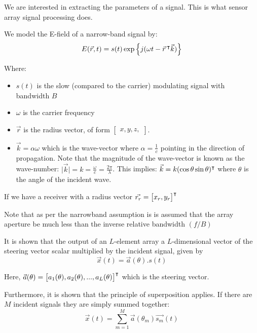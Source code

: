 We are interested in extracting the parameters of a signal. This is what sensor array signal processing does.

We model the E-field of a narrow-band signal by:
\begin{equation}
  E(\vec{r}, t) = s(t) \exp \left\{ j(\omega t - \vec{r}\, ^\intercal \vec{k}) \right\}
\end{equation}

Where:
\begin{itemize}
  \item \(s(t)\) is the slow (compared to the carrier) modulating signal with bandwidth \(B\)
  \item \(\omega\) is the carrier frequency
  \item \( \vec{r} \) is the radius vector, of form \( \begin{bmatrix} x, y, z, \end{bmatrix} \).
  \item \(\vec{k} = \alpha\omega\) which is the wave-vector where \(\alpha = \frac{1}{c}\) pointing in the direction of propagation. Note that the magnitude of the wave-vector is known as the wave-number: \(\lvert \vec{k} \rvert = k = \frac{\omega}{c} = \frac{2\pi}{\lambda}\). This implies: \(\vec{k} = k(\cos\theta \sin\theta)^\intercal\) where \(\theta\) is the angle of the incident wave.
\end{itemize}

If we have a receiver with a radius vector \(\vec{r_r} = \begin{bmatrix} x_r, y_r \end{bmatrix}^\intercal\)

Note that as per the narrowband assumption is is assumed that the array aperture be much less than the inverse relative bandwidth \((f/B)\)

It is shown that the output of an \(L\)-element array a \(L\)-dimensional vector of the steering vector scalar multiplied by the incident signal, given by
\begin{equation}
  \vec{x}(t) = \vec{a}(\theta).s(t)
\end{equation}

Here, \(\vec{a}(\theta) = \begin{bmatrix} a_1(\theta), a_2(\theta), ... , a_L(\theta) \end{bmatrix}^\intercal\) which is the steering vector.

  Furthermore, it is shown that the principle of superposition applies. If there are \(M\) incident signals they are simply summed together:
\begin{equation}
  \vec{x}(t) = \sum_{m=1}^{M} \vec{a}(\theta_m)\vec{s_m}(t)
\end{equation}

